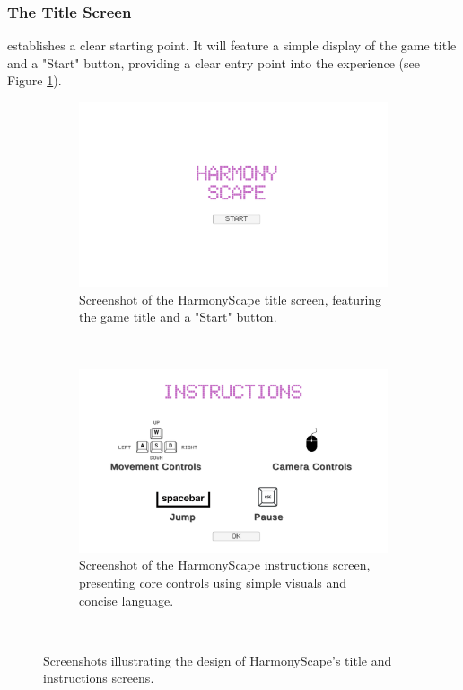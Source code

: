 \documentclass{l4proj}
\begin{document}
\subsubsection{The Title Screen} establishes a clear starting point. It will feature a simple display of the game title and a "Start" button, providing a clear entry point into the experience (see Figure \ref{fig:title_screen}).

\begin{figure}[h]
  \centering
  \begin{subfigure}[t]{0.45\textwidth}
    \includegraphics[width=\textwidth]{dissertation/images/title_screen.png}
    \caption{Screenshot of the HarmonyScape title screen, featuring the game title and a "Start" button.}
    \label{fig:title_screen}
  \end{subfigure}
  ~ 
  \begin{subfigure}[t]{0.45\textwidth}
    \includegraphics[width=\textwidth]{dissertation/images/instructions_screen.png} 
    \caption{Screenshot of the HarmonyScape instructions screen, presenting core controls using simple visuals and concise language.}
    \label{fig:instructions_screen}
  \end{subfigure}
  ~  
  \caption{Screenshots illustrating the design of HarmonyScape's title and instructions screens. }
  \label{fig:intro_screens}
\end{figure}
\end{document}
